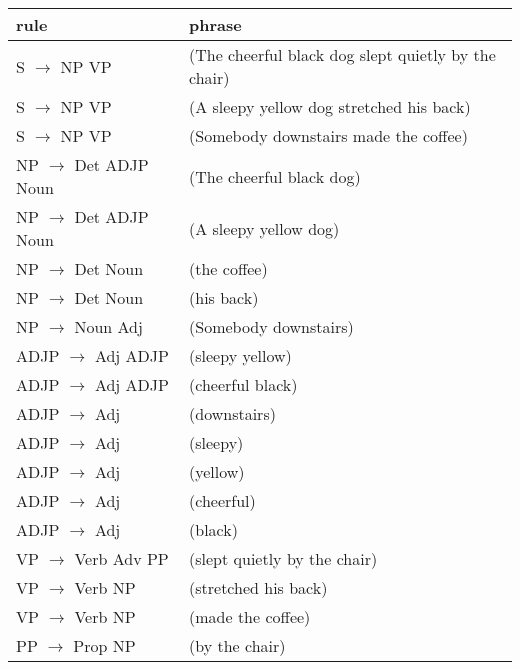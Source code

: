 \documentclass[11pt]{article}
\begin{document}
\begin{center}
\begin{tabular}{ll}
rule & phrase\\
\hline
S \(\rightarrow\) NP VP & (The cheerful black dog slept quietly by the chair)\\
S \(\rightarrow\) NP VP & (A sleepy yellow dog stretched his back)\\
S \(\rightarrow\) NP VP & (Somebody downstairs made the coffee)\\
NP \(\rightarrow\) Det ADJP Noun & (The cheerful black dog)\\
NP \(\rightarrow\) Det ADJP Noun & (A sleepy yellow dog)\\
NP \(\rightarrow\) Det Noun & (the coffee)\\
NP \(\rightarrow\) Det Noun & (his back)\\
NP \(\rightarrow\) Noun Adj & (Somebody downstairs)\\
ADJP \(\rightarrow\) Adj ADJP & (sleepy yellow)\\
ADJP \(\rightarrow\) Adj ADJP & (cheerful  black)\\
ADJP \(\rightarrow\) Adj & (downstairs)\\
ADJP \(\rightarrow\) Adj & (sleepy)\\
ADJP \(\rightarrow\) Adj & (yellow)\\
ADJP \(\rightarrow\) Adj & (cheerful)\\
ADJP \(\rightarrow\) Adj & (black)\\
VP \(\rightarrow\) Verb Adv PP & (slept quietly by the chair)\\
VP \(\rightarrow\) Verb NP & (stretched his back)\\
VP \(\rightarrow\) Verb NP & (made the coffee)\\
PP \(\rightarrow\) Prop NP & (by the chair)\\
\end{tabular}
\end{center}
\end{document}
